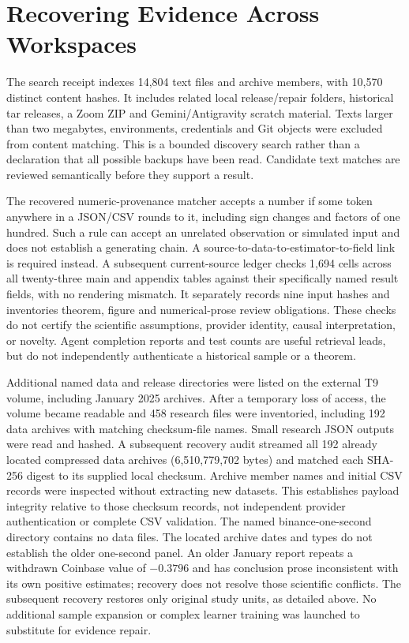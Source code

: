 \section{Recovering Evidence Across Workspaces}
The search receipt indexes 14,804 text files and archive members, with 10,570 distinct content hashes. It includes related local release/repair folders, historical tar releases, a Zoom ZIP and Gemini/Antigravity scratch material. Texts larger than two megabytes, environments, credentials and Git objects were excluded from content matching. This is a bounded discovery search rather than a declaration that all possible backups have been read. Candidate text matches are reviewed semantically before they support a result.

The recovered numeric-provenance matcher accepts a number if some token anywhere in a JSON/CSV rounds to it, including sign changes and factors of one hundred. Such a rule can accept an unrelated observation or simulated input and does not establish a generating chain. A source-to-data-to-estimator-to-field link is required instead. A subsequent current-source ledger checks 1,694 cells across all twenty-three main and appendix tables against their specifically named result fields, with no rendering mismatch. It separately records nine input hashes and inventories theorem, figure and numerical-prose review obligations. These checks do not certify the scientific assumptions, provider identity, causal interpretation, or novelty. Agent completion reports and test counts are useful retrieval leads, but do not independently authenticate a historical sample or a theorem.

Additional named data and release directories were listed on the external T9 volume, including January 2025 archives. After a temporary loss of access, the volume became readable and 458 research files were inventoried, including 192 data archives with matching checksum-file names. Small research JSON outputs were read and hashed. A subsequent recovery audit streamed all 192 already located compressed data archives (6,510,779,702 bytes) and matched each SHA-256 digest to its supplied local checksum. Archive member names and initial CSV records were inspected without extracting new datasets. This establishes payload integrity relative to those checksum records, not independent provider authentication or complete CSV validation. The named binance-one-second directory contains no data files. The located archive dates and types do not establish the older one-second panel. An older January report repeats a withdrawn Coinbase value of $-0.3796$ and has conclusion prose inconsistent with its own positive estimates; recovery does not resolve those scientific conflicts. The subsequent recovery restores only original study units, as detailed above. No additional sample expansion or complex learner training was launched to substitute for evidence repair.

